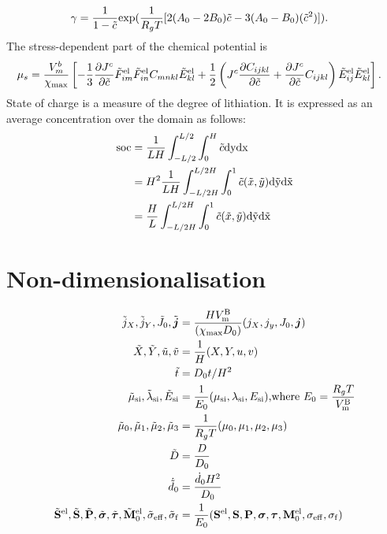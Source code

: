 \begin{align}
    \gamma &= \frac{1}{1-\tilde{c}}\text{exp}(\frac{1}{R_g T}[2(A_0 - 2B_0)\tilde{c} - 3(A_0 - B_0)(\tilde{c}^2)]).
\end{align}
The stress-dependent part of the chemical potential is \citep{2012JMPSCui}
\begin{align}
    \mu_s &= \frac{V_m^b}{\chi_{{\rm{max}}}}\left[-\frac{1}{3}\frac{\partial {J^c}}{\partial \tilde{c}}\tilde{F}_{im}^{{\rm{el}}}\tilde{F}_{in}^{{\rm{el}}}{C}_{mnkl}\tilde{E}_{kl}^{{\rm{el}}} + \frac{1}{2}\left({J^c} \frac{\partial C_{ijkl}}{\partial \tilde{c}} + \frac{\partial {J^c}}{\partial \tilde{c}} C_{ijkl}\right)\tilde{E}_{ij}^{{\rm{el}}}\tilde{E}_{kl}^{{\rm{el}}}\right].
\end{align}
State of charge is a measure of the degree of lithiation. It is expressed as an average concentration over the domain as follows:
\begin{align}
    \rm{soc} &= \frac{1}{LH}\int_{-L/2}^{L/2} \int_0^H \tilde{c} \rm{d}y \rm{d}x  \nonumber \\
         &= H^2\frac{1}{LH} \int_{-L/2H}^{L/2H} \int_0^1 \tilde{c}(\tilde{x}, \tilde{y}) \rm{d}\tilde{y} \rm{d}\tilde{x} \nonumber \\
         &= \frac{H}{L}\int_{-L/2H}^{L/2H} \int_0^1 \tilde{c}(\tilde{x}, \tilde{y}) \rm{d}\tilde{y} \rm{d}\tilde{x} 
\end{align}

\section{Non-dimensionalisation}\label{section:nonDim}
\begin{align}
    \tilde{j}_X, \tilde{j}_Y, \tilde{J}_0, \tilde{\bm{j}} &=  \frac{H V_{\rm{m}}^{\rm{B}}}{(\chi_{{\rm{max}}} D_0)} (j_X, j_y, J_0, \bm{j}) \\
    \tilde{X}, \tilde{Y}, \tilde{u}, \tilde{v} &= \frac{1}{H}(X, Y, u, v) \\
    \tilde{t} &= D_0 t/H^2 \\
     \tilde{\mu}_{\text{si}}, \tilde{\lambda}_{\text{si}}, \tilde{E}_{\text{si}} &= \frac{1}{E_0} (\mu_{\text{si}}, \lambda_{\text{si}}, E_{\text{si}}) 
     \text{,where }  E_0 = \frac{R_g T}{V_{\rm{m}}^{\rm{B}}} \\
     \tilde{\mu}_0, \tilde{\mu}_1, \tilde{\mu}_2, \tilde{\mu}_3 &= \frac{1}{R_g T}(\mu_0, \mu_1, \mu_2, \mu_3) \\
     \tilde{D} &= \frac{D}{D_0} \\
     \dot{\tilde{d}}_{0} &= \frac{{\dot{d}}_0 H^2}{D_0} \\
     \tilde{\mathbf{S}}^{{\rm{el}}}, \tilde{\mathbf{S}}, \tilde{\mathbf{P}}, \tilde{\bm{\sigma}}, \tilde{\bm{\tau}}, \tilde{\mathbf{M}}^{{\rm{el}}}_{0}, \tilde{\sigma}_{\rm{eff}}, \tilde{\sigma}_{\rm{f}} &= \frac{1}{E_0}(\mathbf{S}^{{\rm{el}}}, \mathbf{S}, \mathbf{P}, \bm{\sigma}, \bm{\tau}, \mathbf{M}^{{\rm{el}}}_{0}, \sigma_{\rm{eff}}, \sigma_{\rm{f}})
\end{align}

